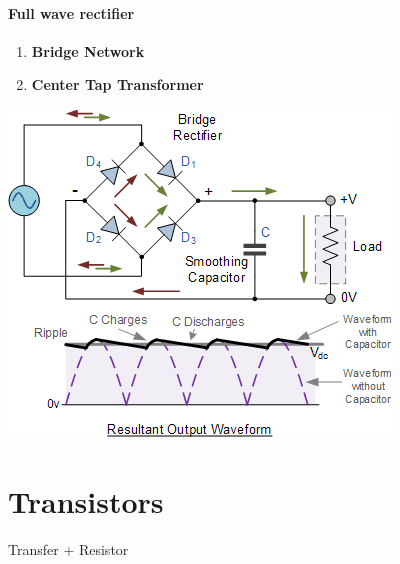 \documentclass[10pt, a4paper]{report}
\begin{document}
		\subsubsection{Full wave rectifier}
		\begin{enumerate}
			\item \textbf{Bridge Network}
			\item \textbf{Center Tap Transformer}
		\end{enumerate}
		\includegraphics[width=\linewidth]{img/full rectifier}

	\chapter{Transistors}
	Transfer + Resistor
\end{document}
